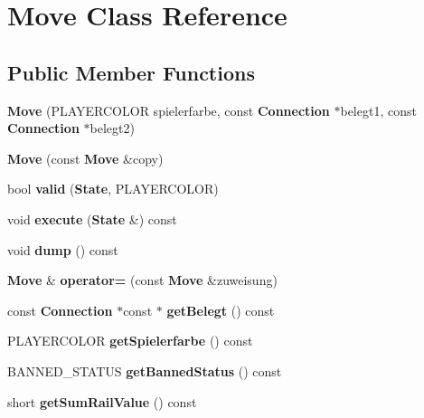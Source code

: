 \section{Move Class Reference}
\label{class_move}
\subsection*{Public Member Functions}
\begin{DoxyCompactItemize}
\item 
{\bfseries Move} (P\-L\-A\-Y\-E\-R\-C\-O\-L\-O\-R spielerfarbe, const {\bf Connection} $\ast$belegt1, const {\bf Connection} $\ast$belegt2)\label{class_move_a6040abbc43f535592305cb0c09b9be0a}

\item 
{\bfseries Move} (const {\bf Move} \&copy)\label{class_move_acbc7c49812f751a195fc4912f572c80f}

\item 
bool {\bfseries valid} ({\bf State}, P\-L\-A\-Y\-E\-R\-C\-O\-L\-O\-R)\label{class_move_a2651074156a1ab353be5f9b8c64649ee}

\item 
void {\bfseries execute} ({\bf State} \&) const \label{class_move_ae647057baca3c5d56261887a4eb2206f}

\item 
void {\bfseries dump} () const \label{class_move_a5fd65957977d9e30fd8898fa4a14ac56}

\item 
{\bf Move} \& {\bfseries operator=} (const {\bf Move} \&zuweisung)\label{class_move_a2cae41881447ddc9496cff2800ce01e2}

\item 
const {\bf Connection} $\ast$const $\ast$ {\bfseries get\-Belegt} () const \label{class_move_a6de84bf9dd651f869956186deb098ccb}

\item 
P\-L\-A\-Y\-E\-R\-C\-O\-L\-O\-R {\bfseries get\-Spielerfarbe} () const \label{class_move_a55523136edbb791118cd74be733a3670}

\item 
B\-A\-N\-N\-E\-D\-\_\-\-S\-T\-A\-T\-U\-S {\bfseries get\-Banned\-Status} () const \label{class_move_a00e138816208d7dc4f7dd3b3d4f87b6a}

\item 
short {\bfseries get\-Sum\-Rail\-Value} () const \label{class_move_a864b7c8036f3e350ff558e586287eecf}

\end{DoxyCompactItemize}

